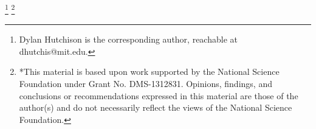 \documentclass[conference]{IEEEtran}
\begin{document}
\maketitle

{\let\thefootnote\relax\footnote{\hspace{-\parindent}Dylan Hutchison is the corresponding
    author, reachable at dhutchis@mit.edu.
}}
{\let\thefootnote\relax\footnote{*This material is based upon work
    supported by the National Science Foundation under Grant
    No. DMS-1312831. Opinions, findings, and conclusions or recommendations expressed in this material are those of the author(s) and do not necessarily reflect the views of the National Science Foundation.
}}
\setcounter{footnote}{0}


\IEEEpeerreviewmaketitle

\let\stimes\times
\renewcommand{\times}[0]{{\,\stimes{}\,}}
\end{document}
